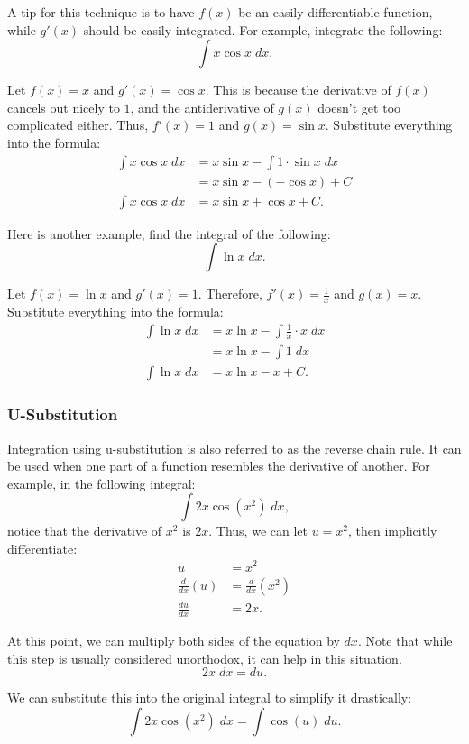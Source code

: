 A tip for this technique is to have $f(x)$ be an easily differentiable function, while $g'(x)$ should be easily integrated. For example, integrate the following:
\[ \int x \cos x \; dx. \]

\noindent Let $f(x) = x$ and $g'(x) = \cos x$. This is because the derivative of $f(x)$ cancels out nicely to $1$, and the antiderivative of $g(x)$ doesn't get too complicated either. Thus, $f'(x) = 1$ and $g(x) = \sin x$. Substitute everything into the formula:
\begin{align*}
	\int x \cos x \; dx &= x \sin x - \int 1 \cdot \sin x \; dx \\[5pt]
	&= x \sin x - (-\cos x) + C \\
	\int x \cos x \; dx &= x \sin x + \cos x + C.
\end{align*}

\noindent Here is another example, find the integral of the following:
\[ \int \ln x \; dx. \]

\noindent Let $f(x) = \ln x$ and $g'(x) = 1$. Therefore, $f'(x) = \frac{1}{x}$ and $g(x) = x$. Substitute everything into the formula:
\begin{align*}
	\int \ln x \; dx &= x \ln x - \int \frac{1}{x} \cdot x \; dx \\[5pt]
	&= x \ln x - \int 1 \; dx \\[5pt]
	\int \ln x \; dx &= x \ln x - x + C.
\end{align*}

\subsubsection{U-Substitution}
Integration using u-substitution is also referred to as the reverse chain rule. It can be used when one part of a function resembles the derivative of another. For example, in the following integral:
\[ \int 2x \cos (x^2) \; dx, \]
notice that the derivative of $x^2$ is $2x$. Thus, we can let $u = x^2$, then implicitly differentiate:
\begin{align*}
	u &= x^2 \\
	\frac{d}{dx} (u) &= \frac{d}{dx} (x^2) \\[5pt]
	\frac{du}{dx} &= 2x.
\end{align*}

At this point, we can multiply both sides of the equation by $dx$. Note that while this step is usually considered unorthodox, it can help in this situation.
\[ 2x \; dx = du. \]

\noindent We can substitute this into the original integral to simplify it drastically:
\[ \int 2x \cos(x^2) \; dx = \int \cos(u) \; du. \]

